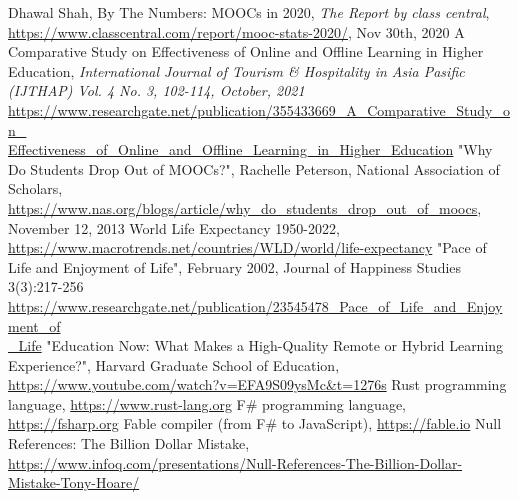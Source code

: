 \documentclass[a4paper,11pt,twoside]{report}
\theoremstyle{definition}
\begin{document}
\begin{thebibliography}{20} %

 Dhawal Shah, By The Numbers: MOOCs in 2020, \emph{The Report by class central}, \href{https://www.classcentral.com/report/mooc-stats-2020/}{https://www.classcentral.com/report/mooc-stats-2020/}, Nov 30th, 2020
 A Comparative Study on Effectiveness of Online and Offline Learning in Higher Education, \emph{International Journal of Tourism \& Hospitality in Asia Pasific (IJTHAP) Vol. 4 No. 3, 102-114, October, 2021}  \href{https://www.researchgate.net/publication/355433669_A_Comparative_Study_on_Effectiveness_of_Online_and_Offline_Learning_in_Higher_Education}{https://www.researchgate.net/publication/355433669\_A\_Comparative\_Study\_on\_\\Effectiveness\_of\_Online\_and\_Offline\_Learning\_in\_Higher\_Education}
 "Why Do Students Drop Out of MOOCs?", Rachelle Peterson, National Association of Scholars, \href{https://www.nas.org/blogs/article/why_do_students_drop_out_of_moocs}{https://www.nas.org/blogs/article/why\_do\_students\_drop\_out\_of\_moocs}, November 12, 2013
 World Life Expectancy 1950-2022, \href{https://www.macrotrends.net/countries/WLD/world/life-expectancy}{https://www.macrotrends.net/countries/WLD/world/life-expectancy}
 "Pace of Life and Enjoyment of Life", February 2002, Journal of Happiness Studies 3(3):217-256 \href{https://www.researchgate.net/publication/23545478_Pace_of_Life_and_Enjoyment_of_Life}{https://www.researchgate.net/publication/23545478\_Pace\_of\_Life\_and\_Enjoyment\_of\\\_Life}
 "Education Now: What Makes a High-Quality Remote or Hybrid Learning Experience?", Harvard Graduate School of Education, \href{https://www.youtube.com/watch?v=EFA9S09ysMc&t=1276s}{https://www.youtube.com/watch?v=EFA9S09ysMc\&t=1276s}
 Rust programming language, \href{https://www.rust-lang.org}{https://www.rust-lang.org}
 F\# programming language, \href{https://fsharp.org}{https://fsharp.org}
 Fable compiler (from F\# to JavaScript), \href{https://fable.io}{https://fable.io}
 Null References: The Billion Dollar Mistake, \href{https://www.infoq.com/presentations/Null-References-The-Billion-Dollar-Mistake-Tony-Hoare/}{https://www.infoq.com/presentations/Null-References-The-Billion-Dollar-Mistake-Tony-Hoare/}
\end{thebibliography}


	
\thispagestyle{empty}

\listoffigures
\thispagestyle{empty}
\end{document}
